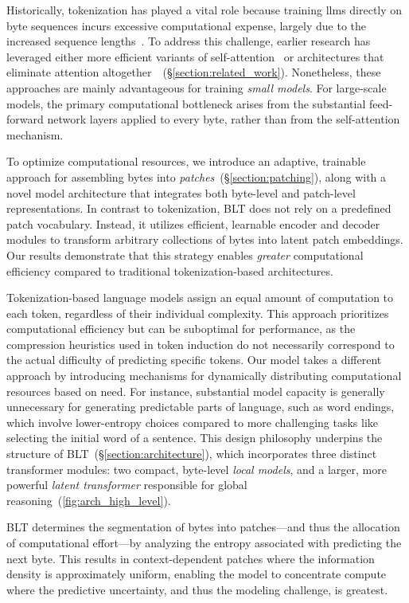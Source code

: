 Historically, tokenization has played a vital role because training llms directly on byte sequences incurs excessive computational expense, largely due to the increased sequence lengths~\citep{xue2022byt5}. To address this challenge, earlier research has leveraged either more efficient variants of self-attention~\citep{el2020characterbert, clark2022canine} or architectures that eliminate attention altogether~\citep{wang2024mambabyte}~(\S\ref{section:related_work}). Nonetheless, these approaches are mainly advantageous for training \textit{small models}. For large-scale models, the primary computational bottleneck arises from the substantial feed-forward network layers applied to every byte, rather than from the self-attention mechanism.

To optimize computational resources, we introduce an adaptive, trainable approach for assembling bytes into \textit{patches}~(\S\ref{section:patching}), along with a novel model architecture that integrates both byte-level and patch-level representations. In contrast to tokenization, {\textsc BLT} does not rely on a predefined patch vocabulary. Instead, it utilizes efficient, learnable encoder and decoder modules to transform arbitrary collections of bytes into latent patch embeddings. Our results demonstrate that this strategy enables \textit{greater} computational efficiency compared to traditional tokenization-based architectures.

Tokenization-based language models assign an equal amount of computation to each token, regardless of their individual complexity. This approach prioritizes computational efficiency but can be suboptimal for performance, as the compression heuristics used in token induction do not necessarily correspond to the actual difficulty of predicting specific tokens. Our model takes a different approach by introducing mechanisms for dynamically distributing computational resources based on need. For instance, substantial model capacity is generally unnecessary for generating predictable parts of language, such as word endings, which involve lower-entropy choices compared to more challenging tasks like selecting the initial word of a sentence. This design philosophy underpins the structure of {\textsc BLT}~(\S\ref{section:architecture}), which incorporates three distinct transformer modules: two compact, byte-level \textit{local models}, and a larger, more powerful \textit{latent transformer} responsible for global reasoning~(\autoref{fig:arch_high_level}).

{\textsc BLT} determines the segmentation of bytes into patches—and thus the allocation of computational effort—by analyzing the entropy associated with predicting the next byte. This results in context-dependent patches where the information density is approximately uniform, enabling the model to concentrate compute where the predictive uncertainty, and thus the modeling challenge, is greatest.

